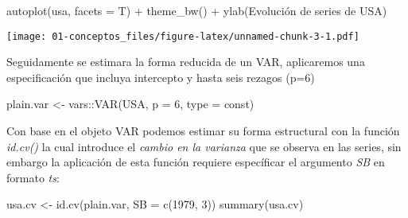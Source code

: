 \documentclass[
]{book}
\newenvironment{Shaded}{\begin{snugshade}}{\end{snugshade}}
\newcommand{\AttributeTok}[1]{\textcolor[rgb]{0.77,0.63,0.00}{#1}}
\newcommand{\DecValTok}[1]{\textcolor[rgb]{0.00,0.00,0.81}{#1}}
\newcommand{\FunctionTok}[1]{\textcolor[rgb]{0.00,0.00,0.00}{#1}}
\newcommand{\NormalTok}[1]{#1}
\newcommand{\OtherTok}[1]{\textcolor[rgb]{0.56,0.35,0.01}{#1}}
\newcommand{\SpecialCharTok}[1]{\textcolor[rgb]{0.00,0.00,0.00}{#1}}
\newcommand{\StringTok}[1]{\textcolor[rgb]{0.31,0.60,0.02}{#1}}
\begin{document}
\begin{Shaded}
\begin{Highlighting}[]
\FunctionTok{autoplot}\NormalTok{(usa, }\AttributeTok{facets =}\NormalTok{ T) }\SpecialCharTok{+} \FunctionTok{theme\_bw}\NormalTok{() }\SpecialCharTok{+} \FunctionTok{ylab}\NormalTok{(}\StringTok{\textquotesingle{}Evolución de series de USA\textquotesingle{}}\NormalTok{)}
\end{Highlighting}
\end{Shaded}

\texttt{[image: 01-conceptos\_files/figure-latex/unnamed-chunk-3-1.pdf]}

Seguidamente se estimara la forma reducida de un VAR, aplicaremos una especificación que incluya intercepto y hasta seis rezagos (p=6)

\begin{Shaded}
\begin{Highlighting}[]
\NormalTok{plain.var }\OtherTok{\textless{}{-}}\NormalTok{ vars}\SpecialCharTok{::}\FunctionTok{VAR}\NormalTok{(USA, }\AttributeTok{p =} \DecValTok{6}\NormalTok{, }\AttributeTok{type =} \StringTok{\textquotesingle{}const\textquotesingle{}}\NormalTok{)}
\end{Highlighting}
\end{Shaded}

Con base en el objeto VAR podemos estimar su forma estructural con la función \emph{id.cv()} la cual introduce el \emph{cambio en la varianza} que se observa en las series, sin embargo la aplicación de esta función requiere específicar el argumento \emph{SB} en formato \emph{ts}:

\begin{Shaded}
\begin{Highlighting}[]
\NormalTok{usa.cv }\OtherTok{\textless{}{-}} \FunctionTok{id.cv}\NormalTok{(plain.var, }\AttributeTok{SB =} \FunctionTok{c}\NormalTok{(}\DecValTok{1979}\NormalTok{, }\DecValTok{3}\NormalTok{))}
\FunctionTok{summary}\NormalTok{(usa.cv)}
\end{Highlighting}
\end{Shaded}
\end{document}
